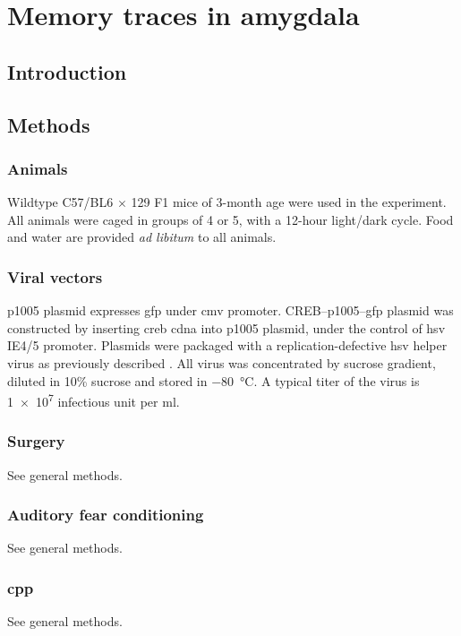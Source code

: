 \chapter{Memory traces in amygdala}

\section{Introduction}

\section{Methods}

\subsection{Animals}
Wildtype C57/BL6 $\times$ 129 F1 mice of 3-month age were used in the experiment. All animals were caged in groups of 4 or 5, with a 12-hour light\slash dark cycle. Food and water are provided \textit{ad libitum} to all animals.

\subsection{Viral vectors}
 p1005 plasmid expresses \gls{gfp} under \gls{cmv} promoter. CREB--p1005--\gls{gfp} plasmid was constructed by inserting \gls{creb} \gls{cdna} into p1005 plasmid, under the control of \gls{hsv} IE4/5 promoter. Plasmids were packaged with a replication-defective \gls{hsv} helper virus as previously described \citep{neve05}. All virus was concentrated by sucrose gradient, diluted in 10\% sucrose and stored in \SI{-80}{\celsius}. A typical titer of the virus is \num{1e7} infectious unit per \si{ml}. 

\subsection{Surgery}
See general methods.

\subsection{Auditory fear conditioning}
See general methods.

\subsection{\Acrlong{cpp}}
See general methods.

